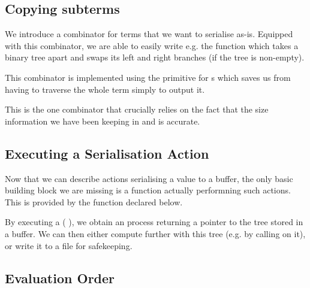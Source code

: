 \subsection{Copying subterms}

We introduce a  combinator for terms that we want to
serialise as-is.
%
Equipped with this combinator, we are able to easily write e.g.
the  function which takes a binary tree apart
and swaps its left and right branches (if the tree is non-empty).



This combinator is implemented using the  primitive
for s which saves us from having to traverse the whole term
simply to output it.


This is the one combinator that crucially relies on the fact that the size
information we have been keeping in  and
 is accurate.

\subsection{Executing a Serialisation Action}

Now that we can describe actions serialising a value to a buffer,
the only basic building block we are missing is a function actually
performning such actions.
%
This is provided by the  function
declared below.


By executing a (  ), we
obtain an  process returning a pointer to the tree 
stored in a buffer.
%
We can then either compute further with this tree (e.g. by calling
 on it), or write it to a file for safekeeping.

\subsection{Evaluation Order}

